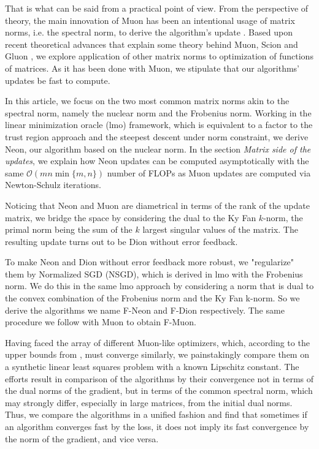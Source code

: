 \documentclass{article} %
\newcommand{\cO}{\mathcal{O}}
\begin{document}
 That is what can be said from a practical point of view. From the perspective of theory, the main innovation of Muon has been an intentional usage of matrix norms, i.e. the spectral norm, to derive the algorithm's update \citep{bernstein2025deriving}. Based upon recent theoretical advances that explain some theory behind Muon, Scion and Gluon \citep{bernstein2025deriving,kovalev2025understanding,pethick2025training,riabinin2025gluon}, we explore application of other matrix norms to optimization of functions of matrices. As it has been done with Muon, we stipulate that our algorithms' updates be fast to compute.

 In this article, we focus on the two most common matrix norms akin to the spectral norm, namely the nuclear norm and the Frobenius norm. Working in the linear minimization oracle (lmo) framework, which is equivalent to a factor to the trust region approach and the steepest descent under norm constraint, we derive Neon, our algorithm based on the nuclear norm. In the section {\it Matrix side of the updates}, we explain how Neon updates can be computed asymptotically with the same $\cO(m n \min\{m, n\})$ number of FLOPs as Muon updates are computed via Newton-Schulz iterations.

 Noticing that Neon and Muon are diametrical in terms of the rank of the update matrix, we bridge the space by considering the dual to the Ky Fan $k$-norm, the primal norm being the sum of the $k$ largest singular values of the matrix. The resulting update turns out to be Dion \citet{ahn2025dioncommunicationefficientoptimizerlarge} without error feedback.
 
 To make Neon and Dion without error feedback more robust, we "regularize" them by Normalized SGD (NSGD), which is derived in lmo with the Frobenius norm. We do this in the same lmo approach by considering a norm that is dual to the convex combination of the Frobenius norm and the Ky Fan k-norm. So we derive the algorithms we name F-Neon and F-Dion respectively. The same procedure we follow with Muon to obtain F-Muon.

 Having faced the array of different Muon-like optimizers, which, according to the upper bounds from \citet{kovalev2025understanding,riabinin2025gluon}, must converge similarly, we painstakingly compare them on a synthetic linear least squares problem with a known Lipschitz constant. The efforts result in comparison of the algorithms by their convergence not in terms of the dual norms of the gradient, but in terms of the common spectral norm, which may strongly differ, especially in large matrices, from the initial dual norms. Thus, we compare the algorithms in a unified fashion and find that sometimes if an algorithm converges fast by the loss, it does not imply its fast convergence by the norm of the gradient, and vice versa.
\end{document}
